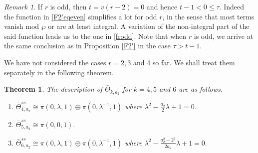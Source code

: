 \documentclass[11pt, reqno]{amsart}
\numberwithin{equation}{section}
\newtheorem{theorem}[thm]{Theorem}
\theoremstyle{definition}
\theoremstyle{remark}
\newtheorem{remark}[thm]{Remark}
\theoremstyle{definition}
\theoremstyle{remark}
\theoremstyle{remark}
\begin{document}
\begin{remark}
    If $r$ is odd, then $t=v(r-2)=0$ and hence $t-1<0\leq\tau$. Indeed the function in \eqref{F2'eqeven} simplifies a lot for odd $r$, in the sense that most terms vanish mod $\wp$ or are at least integral. A variation of the non-integral part of the said function leads us to the one in \eqref{frodd}. Note that when $r$ is odd, we arrive at the same conclusion as in Proposition \ref{F2'} in the case  $\tau>t-1$. \end{remark}
We have not considered the cases $r=2,3$ and $4$ so far. We shall treat them separately in the following theorem. 
\begin{theorem} The description of $\bar{\Theta}_{k,a_{2}}$ for $k=4,5$ and $6$ are as follows.\label{k=4,5,6}
\begin{enumerate}
    \item $\bar{\Theta}^{ss}_{4,a_{2}} \cong \pi(0,\lambda,1)\oplus \pi(0,\lambda^{-1},1)$ where $\lambda^2-\frac{a_{2}}{2}\lambda+1=0$.\label{Theta4a2}
    \item $\bar{\Theta}^{ss}_{5,a_{2}} \cong \pi(0,0,1). $  \label{Theta5a2}
    
    \item $\bar{\Theta}^{ss}_{6,a_{2}} \cong\pi(0,\lambda,1)\oplus \pi(0,\lambda^{-1},1)$ where $\lambda^2-\frac{a_{2}^2-2^2}{2a_{2}}\lambda+1=0.$    \label{Theta6a2}
\end{enumerate}
\end{theorem}
\end{document}
